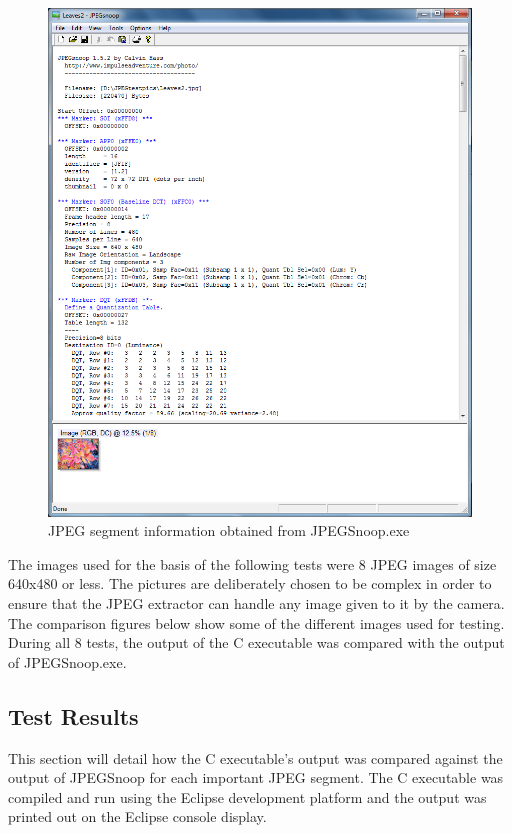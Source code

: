 \begin{figure}[!hbtp]
\begin{center}
\includegraphics[scale=0.6]{figures/jpegSnoopEx1.png} 
\end{center}
\caption{JPEG segment information obtained from JPEGSnoop.exe}
\end{figure}

\newpage

The images used for the basis of the following tests
were 8 JPEG images of size 640x480 or
less. The pictures are deliberately chosen to be 
complex in order to ensure that the JPEG extractor 
can handle any image given to it by the camera.
The comparison figures below show some of the 
different images used for testing. During all 8 tests,
the output of the C executable was compared with
the output of JPEGSnoop.exe.

\subsection{Test Results}

This section will detail how the C executable's output 
was compared against the output of JPEGSnoop 
for each important JPEG segment. The C 
executable was compiled and run using
the Eclipse development platform and the output
was printed out on the Eclipse console display.

